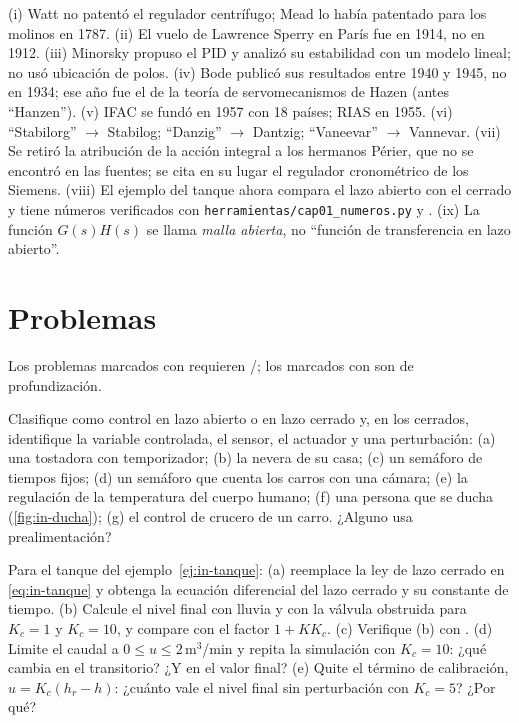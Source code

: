 \begin{profundiza}
(i) Watt no patentó el regulador centrífugo; Mead lo había patentado para los molinos en 1787. (ii) El vuelo de Lawrence Sperry en París fue en 1914, no en 1912. (iii) Minorsky propuso el PID y analizó su estabilidad con un modelo lineal; no usó ubicación de polos. (iv) Bode publicó sus resultados entre 1940 y 1945, no en 1934; ese año fue el de la teoría de servomecanismos de Hazen (antes ``Hanzen''). (v) IFAC se fundó en 1957 con 18 países; RIAS en 1955. (vi) ``Stabilorg'' $\to$ Stabilog; ``Danzig'' $\to$ Dantzig; ``Vaneevar'' $\to$ Vannevar. (vii) Se retiró la atribución de la acción integral a los hermanos Périer, que no se encontró en las fuentes; se cita en su lugar el regulador cronométrico de los Siemens. (viii) El ejemplo del tanque ahora compara el lazo abierto con el cerrado y tiene números verificados con \texttt{herramientas/cap01\_numeros.py} y . (ix) La función $G(s)H(s)$ se llama \emph{malla abierta}, no ``función de transferencia en lazo abierto''.
\end{profundiza}

\section{Problemas}
\label{sec:in-problemas}

Los problemas marcados con \etiquetaM{} requieren \matlab/\simulink; los marcados con \etiquetaEstrella{} son de profundización.

\begin{problema}\label{prob:in-clasificar}
Clasifique como control en lazo abierto o en lazo cerrado y, en los cerrados, identifique la variable controlada, el sensor, el actuador y una perturbación: (a) una tostadora con temporizador; (b) la nevera de su casa; (c) un semáforo de tiempos fijos; (d) un semáforo que cuenta los carros con una cámara; (e) la regulación de la temperatura del cuerpo humano; (f) una persona que se ducha (\cref{fig:in-ducha}); (g) el control de crucero de un carro. ¿Alguno usa prealimentación?
\end{problema}

\begin{problema}\label{prob:in-tanque}
\etiquetaM{} Para el tanque del ejemplo~\ref{ej:in-tanque}: (a) reemplace la ley de lazo cerrado en \eqref{eq:in-tanque} y obtenga la ecuación diferencial del lazo cerrado y su constante de tiempo. (b) Calcule el nivel final con lluvia y con la válvula obstruida para $K_c=1$ y $K_c=10$, y compare con el factor $1+KK_c$. (c) Verifique (b) con . (d) Limite el caudal a $0\le u\le2$\,m$^3$/min y repita la simulación con $K_c=10$: ¿qué cambia en el transitorio? ¿Y en el valor final? (e) Quite el término de calibración, $u=K_c(h_r-h)$: ¿cuánto vale el nivel final sin perturbación con $K_c=5$? ¿Por qué?
\end{problema}

